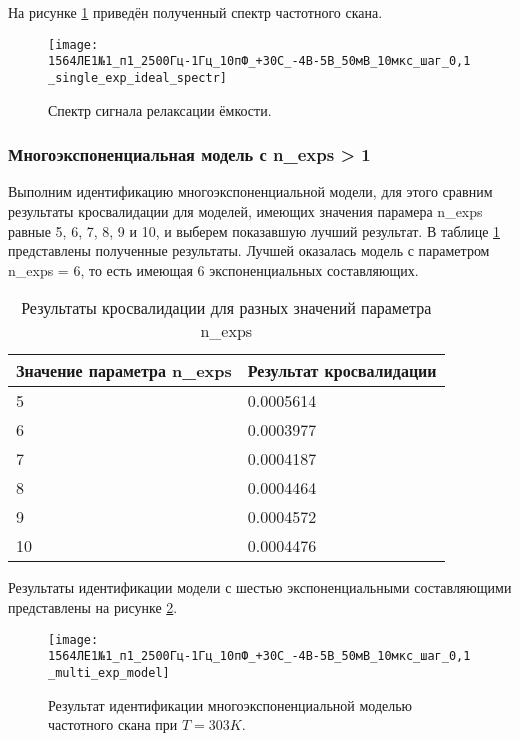 	На рисунке \ref{pic:spectr_single_exp_ideal_303} приведён полученный спектр
	частотного скана.

	\begin{figure}[!htp]
		\centering
		\texttt{[image: 1564ЛЕ1№1\_п1\_2500Гц-1Гц\_10пФ\_+30С\_-4В-5В\_50мВ\_10мкс\_шаг\_0,1\_single\_exp\_ideal\_spectr]}
		\caption{Спектр сигнала релаксации ёмкости.}
		\label{pic:spectr_single_exp_ideal_303}
	\end{figure}


	\newpage
	\subsubsection{Многоэкспоненциальная модель с n\_exps > 1}
	Выполним идентификацию многоэкспоненциальной модели, для этого сравним
	результаты кросвалидации для моделей, имеющих значения парамера n\_exps
	равные 5, 6, 7, 8, 9 и 10, и выберем показавшую лучший результат. В таблице
	\ref{table:multi_exp_model_303_cross_val} представлены полученные результаты.
	Лучшей оказалась модель с параметром n\_exps = 6, то есть имеющая 6 
	экспоненциальных составляющих.

	\begin{table}[!htp]
		\centering
		\caption{Результаты кросвалидации для разных значений параметра n\_exps}
		\begin{tabular}{|l|l|}
		\hline
		Значение параметра n\_exps & Результат кросвалидации \\ \hline
		5                          & 0.0005614               \\ \hline
		6                          & 0.0003977               \\ \hline
		7                          & 0.0004187               \\ \hline
		8                          & 0.0004464               \\ \hline
		9                          & 0.0004572               \\ \hline
		10                         & 0.0004476               \\ \hline
		\end{tabular}
		\label{table:multi_exp_model_303_cross_val}
	\end{table}

	Результаты идентификации модели с шестью экспоненциальными составляющими
	представлены на рисунке \ref{pic:multi_exp_model_303}.

	\begin{figure}[!htp]
		\centering
		\texttt{[image: 1564ЛЕ1№1\_п1\_2500Гц-1Гц\_10пФ\_+30С\_-4В-5В\_50мВ\_10мкс\_шаг\_0,1\_multi\_exp\_model]}
		\caption{Результат идентификации многоэкспоненциальной моделью 
		         частотного скана при $T=303K$.}
		\label{pic:multi_exp_model_303}
	\end{figure}

